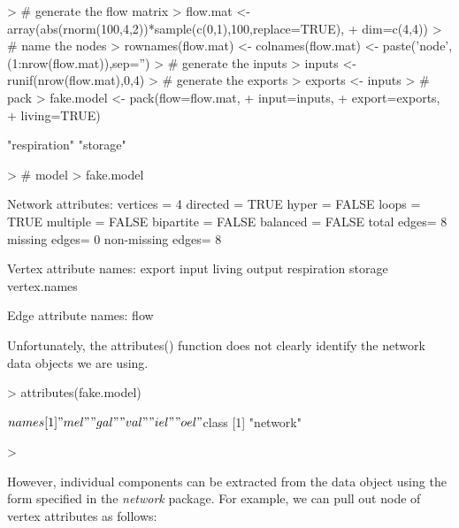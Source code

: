 \documentclass[article]{jss}
\begin{document}
\begin{Schunk}
\begin{Sinput}
> # generate the flow matrix
> flow.mat <- array(abs(rnorm(100,4,2))*sample(c(0,1),100,replace=TRUE),
+                    dim=c(4,4))
> # name the nodes
> rownames(flow.mat) <- colnames(flow.mat) <- paste('node',(1:nrow(flow.mat)),sep='')
> # generate the inputs
> inputs <- runif(nrow(flow.mat),0,4)
> # generate the exports
> exports <- inputs
> # pack
> fake.model <- pack(flow=flow.mat,
+                     input=inputs,
+                     export=exports,
+                     living=TRUE)
\end{Sinput}
\begin{Soutput}
[1] "respiration" "storage"    
\end{Soutput}
\begin{Sinput}
> # model
> fake.model
\end{Sinput}
\begin{Soutput}
 Network attributes:
  vertices = 4 
  directed = TRUE 
  hyper = FALSE 
  loops = TRUE 
  multiple = FALSE 
  bipartite = FALSE 
  balanced = FALSE 
  total edges= 8 
    missing edges= 0 
    non-missing edges= 8 

 Vertex attribute names: 
    export input living output respiration storage vertex.names 

 Edge attribute names: 
    flow 
\end{Soutput}
\end{Schunk}

Unfortunately, the attributes() function does not clearly identify the
network data objects we are using.

\begin{Schunk}
\begin{Sinput}
> attributes(fake.model)
\end{Sinput}
\begin{Soutput}
$names
[1] "mel" "gal" "val" "iel" "oel"

$class
[1] "network"
\end{Soutput}
\begin{Sinput}
> 
\end{Sinput}
\end{Schunk}

However, individual components can be extracted from the data object
using the form specified in the \textit{network} package.  For
example, we can pull out node of vertex attributes as follows:
\end{document}
